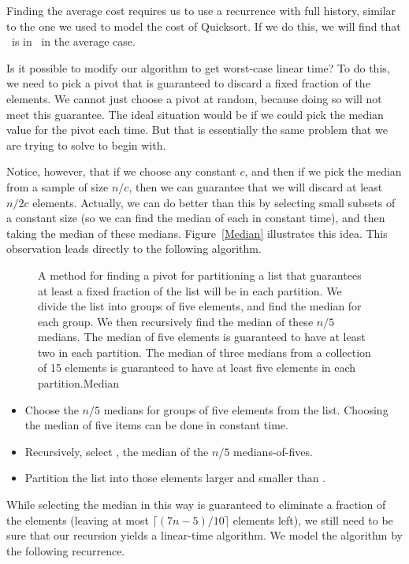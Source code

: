 Finding the average cost requires us to use a recurrence with full
history, similar to the one we used to model the cost of Quicksort.
If we do this, we will find that \Tn\ is in \On\ in the average case.

Is it possible to modify our algorithm to get worst-case linear time?
To do this, we need to pick a pivot that is guaranteed to discard a
fixed fraction of the elements.
We cannot just choose a pivot at random, because doing so will not meet
this guarantee.
The ideal situation would be if we could pick the median value for the
pivot each time.
But that is essentially the same problem that we are trying to solve
to begin with.

Notice, however, that if we choose any constant \(c\),
and then if we pick the median from a sample of size \(n/c\),
then we can guarantee that we will discard at least \(n/2c\)
elements.
Actually, we can do better than this by selecting small subsets of a
constant size (so we can find the median of each in constant time),
and then taking the median of these medians.
Figure~\ref{Median} illustrates this idea.
This observation leads directly to the following algorithm.

\begin{figure}
\medskip

{A method for finding a pivot for partitioning a list that guarantees
at least a fixed fraction of the list will be in each partition.
We divide the list into groups of five elements, and find the median
for each group.
We then recursively find the median of these \(n/5\) medians.
The median of five elements is guaranteed to have at least two in each
partition.
The median of three medians from a collection of 15 elements is
guaranteed to have at least five elements in each partition.}{Median}
\bigskip
\end{figure}


\begin{itemize}
\item Choose the \(n/5\) medians for groups of five elements from the
  list. Choosing the median of five items can be done in constant time.
\item Recursively, select , the median of the \(n/5\)
  medians-of-fives.
\item Partition the list into those elements larger and smaller than
  .
\end{itemize}

While selecting the median in this way is guaranteed to eliminate a
fraction of the elements
(leaving at most \(\lceil (7n - 5)/10\rceil\) elements left),
we still need to be sure that our recursion yields a linear-time
algorithm.
We model the algorithm by the following recurrence.

